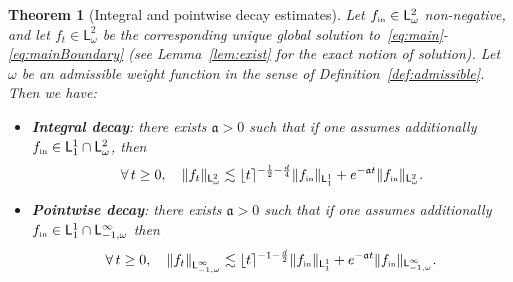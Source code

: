 \documentclass[11pt]{amsart}
\newtheorem{theorem}{Theorem}
\theoremstyle{definition}
\theoremstyle{remark}
\numberwithin{equation}{section}
\newcommand{\init}{\text{{\tiny {\rm in}}}}
\newcommand{\sfL}{\mathsf{L}}
\newcommand{\wangle}[1]{\lfloor #1 \rceil}
\begin{document}
\begin{theorem}[Integral and pointwise decay estimates]
  \label{theo:main}
  Let $f_{\init} \in \sfL^2_\omega$ non-negative, and let $f_t \in \sfL^2_\omega$ be the corresponding unique global solution to~\eqref{eq:main}-\eqref{eq:mainBoundary} (see Lemma~\ref{lem:exist} for the exact notion of solution). Let $\omega$ be an admissible weight function in the sense of Definition~\ref{def:admissible}. Then we have:

  \begin{itemize}
  \item[(i)] \textbf{Integral decay}: there exists $\mathfrak a > 0$ such that if one assumes additionally $f_{\init} \in \sfL^1_1 \cap \sfL^2_\omega$, then
    \begin{equation}
      \label{eq:decay-int}
      \forall \, t \ge 0, \quad \| f_t \|_{\sfL^{2}_\omega} \lesssim \wangle{t}^{-\frac{1}{2}-\frac{d}4} \| f_{\init} \|_{\sfL^{1}_{1}} + e^{-\mathfrak a t} \|  f_{\init} \|_{\sfL^{2}_\omega}.
    \end{equation}
  \item[(ii)] \textbf{Pointwise decay}: there exists $\mathfrak a > 0$ such that if one assumes additionally $f_{\init} \in \sfL^1_1 \cap \sfL^\infty _{-1,\omega}$ then
    \begin{equation}\label{eq:decay-pw}
      \forall \, t \ge 0, \quad \left\Vert f_t \right\Vert_{\sfL_{-1,\omega}^\infty} \lesssim \wangle{t}^{-1-\frac{d}2} \| f_{\init} \|_{\sfL^{1}_{1}} + e^{-\mathfrak a t} \| f_{\init} \|_{\sfL^{\infty}_{-1,\omega}}.
    \end{equation}
  \end{itemize}
\end{theorem}
\end{document}
